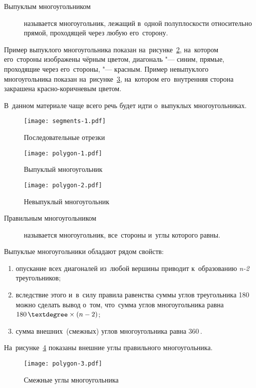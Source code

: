 \documentclass[]{scrartcl}
\begin{document}
\begin{description}
	\item[Выпуклым многоугольником] называется многоугольник, лежащий в~одной полуплоскости относительно прямой, проходящей через любую его~сторону.
\end{description}
Пример выпуклого многоугольника показан на~рисунке~\ref{fig:polygon-1}, на~котором его~стороны изображены чёрным цветом, диагональ "--- синим, прямые, проходящие через его~стороны, "--- красным.
Пример невыпуклого многоугольника показан на~рисунке~\ref{fig:polygon-2}, на~котором его~внутренняя сторона закрашена красно-коричневым цветом.

В~данном материале чаще всего речь будет идти о~выпуклых многоугольниках.
 
\begin{figure}[ht]
\centering %
\texttt{[image: segments-1.pdf]}
\caption{Последовательные отрезки}\label{fig:segments-1}
\end{figure}

\begin{figure}[ht]
\centering %
\texttt{[image: polygon-1.pdf]}
\caption{Выпуклый многоугольник}\label{fig:polygon-1}
\end{figure}  

\begin{figure}[ht]
\centering %
\texttt{[image: polygon-2.pdf]}
\caption{Невыпуклый многоугольник}\label{fig:polygon-2}
\end{figure} 

\begin{description}
	\item[Правильным многоугольником] называется многоугольник, все~стороны и~углы которого равны.
\end{description} 

Выпуклые многоугольники обладают рядом свойств:
\begin{enumerate}
	\item опускание всех диагоналей из~любой вершины приводит к~образованию \textit{n-2} треугольников;
	\item вследствие этого и~в~силу правила равенства суммы углов треугольника 180\,\textdegree можно сделать вывод о~том, что~сумма углов многоугольника равна $180\,\textdegree \times (n-2)$;
	\item сумма внешних~(смежных) углов многоугольника равна 360\,\textdegree.
\end{enumerate}  
На~рисунке~\ref{fig:polygon-3} показаны внешние углы правильного многоугольника.
\begin{figure}[ht]
	\centering %
	\texttt{[image: polygon-3.pdf]}
	\caption{Смежные углы многоугольника}\label{fig:polygon-3}
\end{figure}
\end{document}
